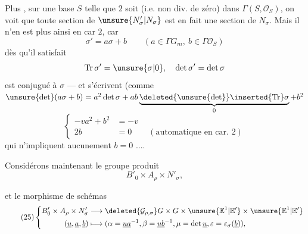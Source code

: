 Plus , sur une base $S$ telle que
$2$  soit  
(i.e. non div. de zéro) dans $\Gamma(S,\mathcal O_S)$, on voit que toute section de
$\unsure{N'_\sigma|N_\sigma}$ est en fait une section de $N_\sigma$.
Mais il n'en est plus ainsi en car $2$, car
\[
\sigma'=a\sigma+b\qquad(a\in\Gamma G_m,\ b\in\Gamma\mathcal O_S)
\]
dès qu'il satisfait
\[
\operatorname{Tr}\sigma'=\unsure{\sigma|0},\quad\det\sigma'=\det\sigma
\]
est conjugué  à $\sigma$ --- et
 
s'écrivent (comme
$\unsure{\det}(a\sigma+b)=a^2\det\sigma+
 ab\underbrace{\deleted{\unsure{\det}}\inserted{\operatorname{Tr}}\sigma}_{0}+b^2$
\[
\left\{\begin{aligned}
-va^2+b^2&=-v\\
2b&=0\qquad(\text{automatique en car. }2)
\end{aligned}\right.
\]
qui n'impliquent aucunement $b=0$ ....

 Considérons maintenant le groupe produit
\[
B'_0\times A_\rho\times N'_\sigma,
\]


et le morphisme de schémas
\[
\tag{25}
\left\{\begin{aligned}
B'_0\times A_\rho\times N'_\sigma
&\longrightarrow \deleted{\mathcal G_{\rho,\sigma}}
 G\times G\times\unsure{\mathbb E^1|\mathbb E'}\times\unsure{\mathbb E^1|\mathbb E'}\\
(\underline u,\underline a,\underline b)
&\longmapsto
(\alpha=\underline u\underline a^{-1},\beta=\underline u\underline b^{-1},
\mu=\det\underline u,\varepsilon=\varepsilon_\sigma(\underline b)),
\end{aligned}\right.
\]

